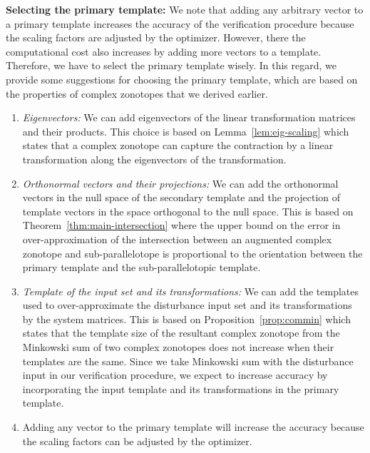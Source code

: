 {\bf Selecting the primary template:  }  We note that adding any
arbitrary vector to a primary template increases the accuracy of the
verification procedure because the scaling factors are adjusted by the
optimizer.  However, there the computational cost also increases by
adding more vectors to a template.  Therefore, we have to select the
primary template wisely.  In this regard, we provide some suggestions
for choosing the primary template, which are based on the properties of
complex zonotopes that we derived earlier.
%
\begin{enumerate}
\item \emph{Eigenvectors:  }  We can add eigenvectors of the linear
transformation matrices and their products.  This choice is based on
Lemma~\ref{lem:eig-scaling} which states that a complex zonotope can
capture the contraction by a linear transformation along the
eigenvectors of the transformation.
\item \emph{Orthonormal vectors and their projections:  }  We can add
the orthonormal vectors in the null space of the secondary template
and the projection of template vectors in the space orthogonal to the
null space.  This is based on Theorem~\ref{thm:main-intersection}
where the upper bound on the error in over-approximation of the intersection
between an augmented complex zonotope and sub-parallelotope is
proportional to the orientation between the primary template and the
sub-parallelotopic template.
\item \emph{Template of the input set and its transformations:  }  We can add the templates
used to over-approximate the disturbance input set and its
transformations by the system matrices.  This is based on
Proposition~\ref{prop:commin} which states that the template size of
the resultant complex zonotope from the Minkowski sum of two complex
zonotopes does not increase when their templates are the same.  Since
we take Minkowski sum with the disturbance input in our verification
procedure, we expect to increase accuracy by incorporating the input
template and its transformations in the primary template.
\item Adding any vector to the primary template will increase the
accuracy because the scaling factors can be adjusted by the
optimizer.
\end{enumerate}
